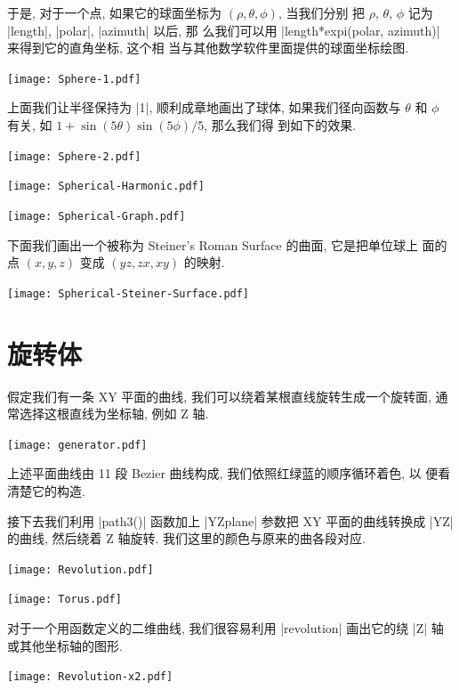 \documentclass[nofonts,CJKnormalspaces]{ctexbook}
\begin{document}
于是, 对于一个点, 如果它的球面坐标为 $(\rho,\theta,\phi)$, 当我们分别
把 $\rho$, $\theta$, $\phi$ 记为 |length|, |polar|, |azimuth| 以后, 那
么我们可以用 |length*expi(polar, azimuth)| 来得到它的直角坐标, 这个相
当与其他数学软件里面提供的球面坐标绘图.

\begin{center}\texttt{[image: Sphere-1.pdf]}\end{center}%

上面我们让半径保持为 |1|, 顺利成章地画出了球体, 如果我们径向函数与
$\theta$ 和 $\phi$ 有关, 如 $1+\sin(5\theta)\sin(5\phi)/5$, 那么我们得
到如下的效果.
\begin{center}\texttt{[image: Sphere-2.pdf]}\end{center}%


\begin{center}\texttt{[image: Spherical-Harmonic.pdf]}\end{center}%


\begin{center}\texttt{[image: Spherical-Graph.pdf]}\end{center}%



下面我们画出一个被称为 Steiner's Roman Surface 的曲面, 它是把单位球上
面的点 $(x,y,z)$ 变成 $(yz,zx,xy)$ 的映射.
\begin{center}\texttt{[image: Spherical-Steiner-Surface.pdf]}\end{center}%


\section{旋转体}
假定我们有一条 XY 平面的曲线, 我们可以绕着某根直线旋转生成一个旋转面,
通常选择这根直线为坐标轴, 例如 Z 轴.
\begin{center}\texttt{[image: generator.pdf]}\end{center}%

上述平面曲线由 11 段 Bezier 曲线构成, 我们依照红绿蓝的顺序循环着色, 以
便看清楚它的构造.

接下去我们利用 |path3()| 函数加上 |YZplane| 参数把 XY 平面的曲线转换成
|YZ| 的曲线, 然后绕着 Z 轴旋转. 我们这里的颜色与原来的曲各段对应.
\begin{center}\texttt{[image: Revolution.pdf]}\end{center}%


\begin{center}\texttt{[image: Torus.pdf]}\end{center}%

对于一个用函数定义的二维曲线, 我们很容易利用 |revolution| 画出它的绕
|Z| 轴或其他坐标轴的图形.
\begin{center}\texttt{[image: Revolution-x2.pdf]}\end{center}%

\end{document}
